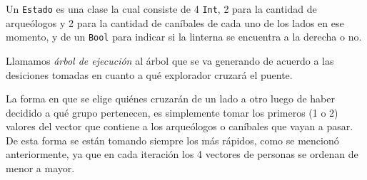             Un \texttt{Estado} es una clase la cual consiste de 4 \texttt{Int}, 2 para la cantidad de arqueólogos y 2 para la cantidad de caníbales de cada uno de los lados en ese momento, y de un \texttt{Bool} para indicar si la linterna se encuentra a la derecha o no.

            Llamamos \emph{árbol de ejecución} al árbol que se va generando de acuerdo a las desiciones tomadas en cuanto a qué explorador cruzará el puente.

            La forma en que se elige quiénes cruzarán de un lado a otro luego de haber decidido a qué grupo pertenecen, es simplemente tomar los primeros (1 o 2) valores del vector que contiene a los arqueólogos o caníbales que vayan a pasar. De esta forma se están tomando siempre los más rápidos, como se mencionó anteriormente, ya que en cada iteración los 4 vectores de personas se ordenan de menor a mayor.

